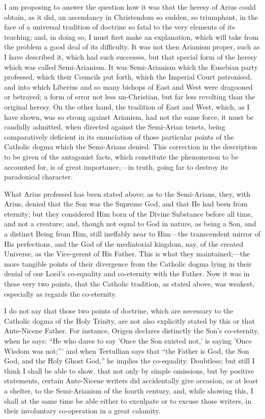 
I am proposing to answer the question how it was that the
heresy of Arius could obtain, as it did, an ascendancy in Christendom
so sudden, so triumphant, in the face of a universal tradition of
doctrine so fatal to the very elements of its teaching; and, in doing
so, I must first make an explanation, which will take from the problem
a good deal of its difficulty. It was not then Arianism proper, such
as I have described it, which had such successes, but that special
form of the heresy which was called Semi-Arianism. It was
Semi-Arianism which the Eusebian party professed, which their Councils
put forth, which the Imperial Court patronised, and into which
Liberius and so many bishops of East and West were dragooned or
betrayed; a form of error not less un-Christian, but far less
revolting than the original heresy. On the other hand, the tradition
of East and West, which, as I have shown, was so strong against
Arianism, had not the same force, it must be candidly admitted, when
directed against the Semi-Arian tenets, being comparatively deficient
in its enunciation of those particular points of the Catholic dogma
which the Semi-Arians denied. This correction in the description to be
given of the antagonist facts, which constitute the phenomenon to be
accounted for, is of great importance,—in truth, going far to
destroy its paradoxical character.

What Arius professed has been stated above; as to the Semi-Arians,
they, with Arius, denied that the Son was the Supreme God, and that He
had been from eternity; but they considered Him born of the Divine
Substance before all time, and not a creature; and, though not equal
to God in nature, as being a Son, and a distinct Being from Him, still
ineffably near to Him—the transcendent mirror of His perfections,
and the God of the mediatorial kingdom, nay, of the created Universe,
as the Vice-gerent of His Father. This is what they maintained;—the
more tangible points of their divergence from the Catholic dogma lying
in their denial of our Lord's co-equality and co-eternity with the
Father. Now it was in these very two points, that the Catholic
tradition, as stated above, was weakest, especially as regards the
co-eternity.

I do not say that those two points of doctrine, which are necessary
to the Catholic dogma of the Holy Trinity, are not also explicitly
stated by this or that Ante-Nicene Father. For instance, Origen
declares distinctly the Son's co-eternity, when he says: ``He who
dares to say 'Once the Son existed not,' is saying 'Once Wisdom was
not;''' and when Tertullian says that ``the Father is God, the
Son God, and the Holy Ghost God,'' he implies the co-equality.
Doubtless; but still I think I shall be able to show, that not only by
simple omissions, but by positive statements, certain Ante-Nicene
writers did accidentally give occasion, or at least a shelter, to the
Semi-Arianism of the fourth century, and, while showing this, I shall
at the same time be able either to exculpate or to excuse those
writers, in their involuntary co-operation in a great calamity.

